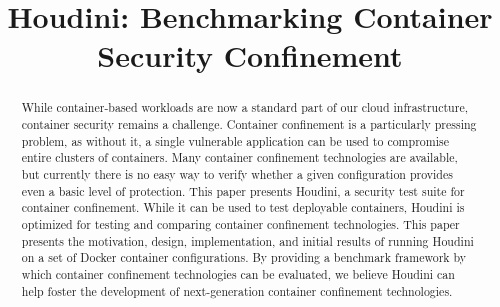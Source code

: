 \documentclass[conference]{IEEEtran}
\begin{document}
\newcommand{\cmark}{\textcolor{green}{\ding{51}}}  %
\newcommand{\xmark}{\textcolor{red}{\ding{55}}}    %


\title{Houdini: Benchmarking Container\\ Security Confinement}


\maketitle
\thispagestyle{plain}
\pagestyle{plain}
\begin{abstract}
  While container-based workloads are now a standard part of our cloud infrastructure, container security remains a challenge. Container confinement is a particularly pressing problem, as without it, a single vulnerable application can be used to compromise entire clusters of containers. Many container confinement technologies are available, but currently there is no easy way to verify whether a given configuration provides even a basic level of protection. This paper presents Houdini, a security test suite for container confinement. While it can be used to test deployable containers, Houdini is optimized for testing and comparing container confinement technologies. This paper presents the motivation, design, implementation, and initial results of running Houdini on a set of Docker container configurations. By providing a benchmark framework by which container confinement technologies can be evaluated, we believe Houdini can help foster the development of next-generation container confinement technologies.
\end{abstract}














\end{document}
